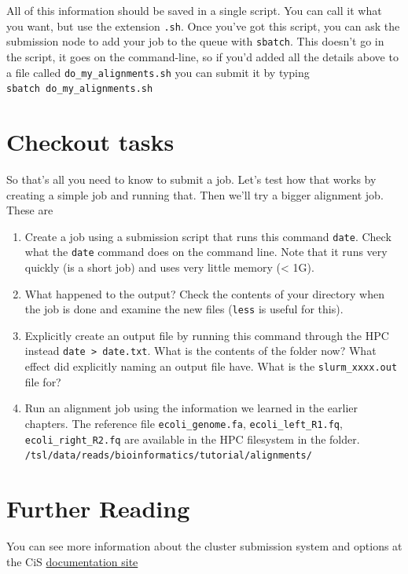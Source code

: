 \documentclass[]{book}
\providecommand{\tightlist}{%
  \setlength{\itemsep}{0pt}\setlength{\parskip}{0pt}}
\begin{document}
All of this information should be saved in a single script. You can call it what you want, but use the extension \texttt{.sh}. Once you've got this script, you can ask the submission node to add your job to the queue with \texttt{sbatch}. This doesn't go in the script, it goes on the command-line, so if you'd added all the details above to a file called \texttt{do\_my\_alignments.sh} you can submit it by typing \texttt{sbatch\ do\_my\_alignments.sh}

\hypertarget{checkout-tasks}{%
\section{Checkout tasks}\label{checkout-tasks}}

So that's all you need to know to submit a job. Let's test how that works by creating a simple job and running that. Then we'll try a bigger alignment job. These are

\begin{enumerate}
\def\labelenumi{\arabic{enumi}.}
\tightlist
\item
  Create a job using a submission script that runs this command \texttt{date}. Check what the \texttt{date} command does on the command line. Note that it runs very quickly (is a short job) and uses very little memory (\textless{} 1G).
\item
  What happened to the output? Check the contents of your directory when the job is done and examine the new files (\texttt{less} is useful for this).
\item
  Explicitly create an output file by running this command through the HPC instead \texttt{date\ \textgreater{}\ date.txt}. What is the contents of the folder now? What effect did explicitly naming an output file have. What is the \texttt{slurm\_xxxx.out} file for?
\item
  Run an alignment job using the information we learned in the earlier chapters. The reference file \texttt{ecoli\_genome.fa}, \texttt{ecoli\_left\_R1.fq}, \texttt{ecoli\_right\_R2.fq} are available in the HPC filesystem in the folder. \texttt{/tsl/data/reads/bioinformatics/tutorial/alignments/}
\end{enumerate}

\hypertarget{further-reading-4}{%
\section{Further Reading}\label{further-reading-4}}

You can see more information about the cluster submission system and options at the CiS \href{https://docs.cis.nbi.ac.uk/display/CIS/Run+a+simple+job+on+the+cluster}{documentation site}


\end{document}
